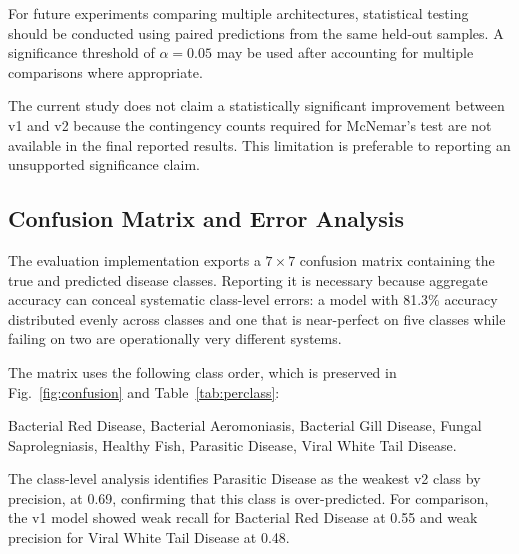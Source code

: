 \documentclass[conference]{IEEEtran}
\begin{document}
For future experiments comparing multiple architectures, statistical testing should be conducted using paired predictions from the same held-out samples. A significance threshold of $\alpha=0.05$ may be used after accounting for multiple comparisons where appropriate.

The current study does not claim a statistically significant improvement between v1 and v2 because the contingency counts required for McNemar's test \cite{b16} are not available in the final reported results. This limitation is preferable to reporting an unsupported significance claim.

\subsection{Confusion Matrix and Error Analysis}

The evaluation implementation exports a $7\times7$ confusion matrix containing the true and predicted disease classes. Reporting it is necessary because aggregate accuracy can conceal systematic class-level errors: a model with 81.3\% accuracy distributed evenly across classes and one that is near-perfect on five classes while failing on two are operationally very different systems.

The matrix uses the following class order, which is preserved in Fig.~\ref{fig:confusion} and Table~\ref{tab:perclass}:

\begin{center}
\scriptsize
Bacterial Red Disease,
Bacterial Aeromoniasis,
Bacterial Gill Disease,
Fungal Saprolegniasis,
Healthy Fish,
Parasitic Disease,
Viral White Tail Disease.
\end{center}

The class-level analysis identifies Parasitic Disease as the weakest v2 class by precision, at 0.69, confirming that this class is over-predicted. For comparison, the v1 model showed weak recall for Bacterial Red Disease at 0.55 and weak precision for Viral White Tail Disease at 0.48.
\end{document}

